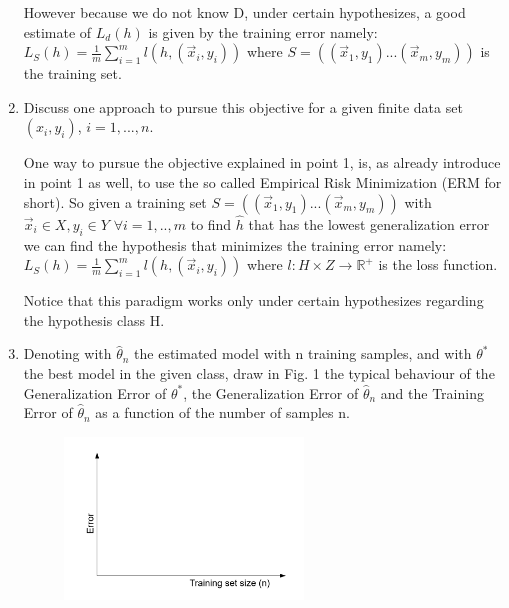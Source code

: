 \documentclass[a4paper,11pt,oneside]{book}
\begin{document}
\begin{enumerate}
\begin{solution}
            However because we do not know D, under certain hypothesizes, a good estimate of $L_d(h)$ is given by the training error namely: $L_S(h) = \frac{1}{m}\sum_{i=1}^m l(h,(\vec{x}_i,y_i))$ where $S = ((\vec{x}_1,y_1)...(\vec{x}_m,y_m))$ is the training set.
        \end{solution}
    \clearpage
    \item Discuss one approach to pursue this objective for a given finite data set $(x_i,y_i)$, $i=1,...,n$.
        \begin{solution}
            One way to pursue the objective explained in point 1, is, as already introduce in point 1 as well, to use the so called Empirical Risk Minimization (ERM for short). So given a training set $S = ((\vec{x}_1,y_1)...(\vec{x}_m,y_m))$ with $\vec{x}_i \in X, y_i \in Y$ $\forall i = 1,..,m$ to find $\hat{h}$ that has the lowest generalization error we can find the hypothesis that minimizes the training error namely: $L_S(h) = \frac{1}{m}\sum_{i=1}^m l(h,(\vec{x}_i,y_i))$ where $l: H\times Z \to \mathbb{R}^+$ is the loss function.
            
            Notice that this paradigm works only under certain hypothesizes regarding the hypothesis class H.
        \end{solution}
    \item Denoting with $\hat{\theta}_n$ the estimated model with n training samples, and with $\theta^*$ the best model in the given class, draw in Fig. 1 the typical behaviour of the Generalization Error of $\theta^*$, the Generalization Error of $\hat{\theta}_n$ and the Training Error of $\hat{\theta}_n$ as a function of the number of samples n.

    \begin{figure}[H]
    \centering
    \includegraphics[width=0.6\textwidth,height=0.4\textheight,keepaspectratio]{images/1_1_July_2019.png}
    \end{figure}
    \end{enumerate}
\end{document}
